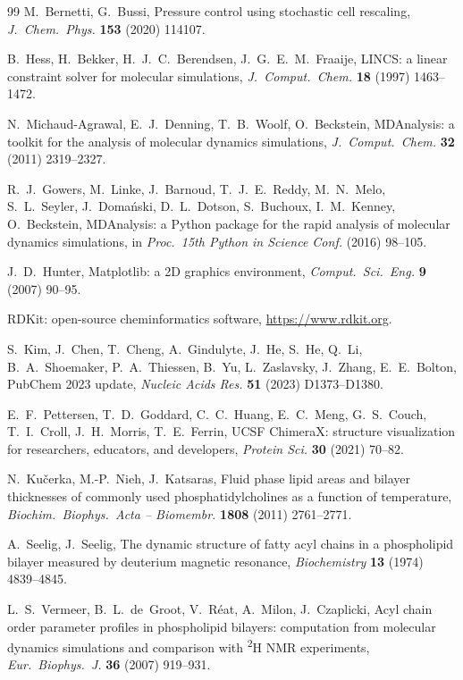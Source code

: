 \documentclass[11pt,a4paper]{article}
\begin{document}
\begin{thebibliography}{99}
M.~Bernetti, G.~Bussi,
Pressure control using stochastic cell rescaling, \emph{J.\ Chem.\ Phys.} \textbf{153} (2020) 114107.

B.~Hess, H.~Bekker, H.~J.~C.~Berendsen, J.~G.~E.~M.~Fraaije,
LINCS: a linear constraint solver for molecular simulations,
\emph{J.\ Comput.\ Chem.} \textbf{18} (1997) 1463--1472.

N.~Michaud-Agrawal, E.~J.~Denning, T.~B.~Woolf, O.~Beckstein,
MDAnalysis: a toolkit for the analysis of molecular dynamics simulations,
\emph{J.\ Comput.\ Chem.} \textbf{32} (2011) 2319--2327.

R.~J.~Gowers, M.~Linke, J.~Barnoud, T.~J.~E.~Reddy, M.~N.~Melo, S.~L.~Seyler, J.~Doma\'{n}ski,
D.~L.~Dotson, S.~Buchoux, I.~M.~Kenney, O.~Beckstein,
MDAnalysis: a Python package for the rapid analysis of molecular dynamics simulations,
in \emph{Proc.\ 15th Python in Science Conf.} (2016) 98--105.

J.~D.~Hunter, Matplotlib: a 2D graphics environment,
\emph{Comput.\ Sci.\ Eng.} \textbf{9} (2007) 90--95.

RDKit: open-source cheminformatics software, \url{https://www.rdkit.org}.

S.~Kim, J.~Chen, T.~Cheng, A.~Gindulyte, J.~He, S.~He, Q.~Li, B.~A.~Shoemaker, P.~A.~Thiessen,
B.~Yu, L.~Zaslavsky, J.~Zhang, E.~E.~Bolton,
PubChem 2023 update, \emph{Nucleic Acids Res.} \textbf{51} (2023) D1373--D1380.

E.~F.~Pettersen, T.~D.~Goddard, C.~C.~Huang, E.~C.~Meng, G.~S.~Couch, T.~I.~Croll, J.~H.~Morris,
T.~E.~Ferrin,
UCSF ChimeraX: structure visualization for researchers, educators, and developers,
\emph{Protein Sci.} \textbf{30} (2021) 70--82.

N.~Ku\v{c}erka, M.-P.~Nieh, J.~Katsaras,
Fluid phase lipid areas and bilayer thicknesses of commonly used phosphatidylcholines as a function of
temperature, \emph{Biochim.\ Biophys.\ Acta -- Biomembr.} \textbf{1808} (2011) 2761--2771.

A.~Seelig, J.~Seelig,
The dynamic structure of fatty acyl chains in a phospholipid bilayer measured by deuterium magnetic
resonance, \emph{Biochemistry} \textbf{13} (1974) 4839--4845.

L.~S.~Vermeer, B.~L.~de~Groot, V.~R\'{e}at, A.~Milon, J.~Czaplicki,
Acyl chain order parameter profiles in phospholipid bilayers: computation from molecular dynamics
simulations and comparison with \textsuperscript{2}H NMR experiments,
\emph{Eur.\ Biophys.\ J.} \textbf{36} (2007) 919--931.
\end{thebibliography}
\end{document}
